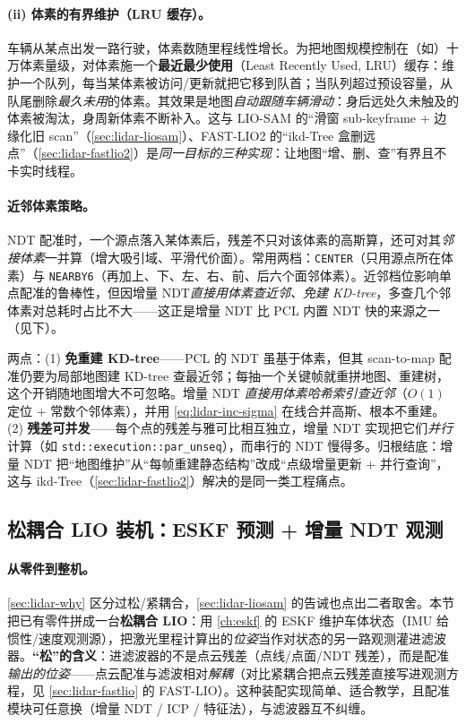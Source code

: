 \paragraph{(ii) 体素的有界维护（LRU 缓存）。}
车辆从某点出发一路行驶，体素数随里程线性增长。为把地图规模控制在（如）十万体素量级，对体素施一个\textbf{最近最少使用}（Least Recently Used, LRU）缓存\cite{gao2023slamad}：维护一个队列，每当某体素被访问/更新就把它移到队首；当队列超过预设容量，从队尾删除\emph{最久未用}的体素。其效果是地图\emph{自动跟随车辆滑动}：身后远处久未触及的体素被淘汰，身周新体素不断补入。这与 LIO-SAM 的“滑窗 sub-keyframe + 边缘化旧 scan”（\cref{sec:lidar-liosam}）、FAST-LIO2 的“ikd-Tree 盒删远点”（\cref{sec:lidar-fastlio2}）是\emph{同一目标的三种实现}：让地图“增、删、查”有界且不卡实时线程。

\paragraph{近邻体素策略。}
NDT 配准时，一个源点落入某体素后，残差不只对该体素的高斯算，还可对其\emph{邻接体素}一并算（增大吸引域、平滑代价面）。常用两档：\texttt{CENTER}（只用源点所在体素）与 \texttt{NEARBY6}（再加上、下、左、右、前、后六个面邻体素）\cite{gao2023slamad}。近邻档位影响单点配准的鲁棒性，但因增量 NDT\emph{直接用体素查近邻、免建 KD-tree}，多查几个邻体素对总耗时占比不大——这正是增量 NDT 比 PCL 内置 NDT 快的来源之一（见下）。

\begin{insight}\label{ins:lidar-inc-ndt}
两点\cite{gao2023slamad}：(1) \textbf{免重建 KD-tree}——PCL 的 NDT 虽基于体素，但其 scan-to-map 配准仍要为局部地图建 KD-tree 查最近邻；每抽一个关键帧就重拼地图、重建树，这个开销随地图增大不可忽略。增量 NDT \emph{直接用体素哈希索引查近邻}（$O(1)$ 定位 + 常数个邻体素），并用 \cref{eq:lidar-inc-sigma} 在线合并高斯、根本不重建。(2) \textbf{残差可并发}——每个点的残差与雅可比相互独立，增量 NDT 实现把它们\emph{并行}计算（如 \texttt{std::execution::par\_unseq}），而串行的 NDT 慢得多。归根结底：增量 NDT 把“地图维护”从“每帧重建静态结构”改成“点级增量更新 + 并行查询”，这与 ikd-Tree（\cref{sec:lidar-fastlio2}）解决的是同一类工程痛点。
\end{insight}

\subsection{松耦合 LIO 装机：ESKF 预测 + 增量 NDT 观测}
\label{sec:lidar-loose-lio}

\paragraph{从零件到整机。}
\cref{sec:lidar-why} 区分过松/紧耦合，\cref{sec:lidar-liosam} 的告诫也点出二者取舍。本节把已有零件拼成一台\textbf{松耦合 LIO}\cite{gao2023slamad}：用 \cref{ch:eskf} 的 ESKF 维护车体状态（IMU 给惯性/速度观测源），把激光里程计算出的\emph{位姿}当作对状态的另一路观测灌进滤波器。\textbf{“松”的含义}：进滤波器的不是点云残差（点线/点面/NDT 残差），而是配准\emph{输出的位姿}——点云配准与滤波相对\emph{解耦}（对比紧耦合把点云残差直接写进观测方程，见 \cref{sec:lidar-fastlio} 的 FAST-LIO）。这种装配实现简单、适合教学，且配准模块可任意换（增量 NDT / ICP / 特征法），与滤波器互不纠缠。

